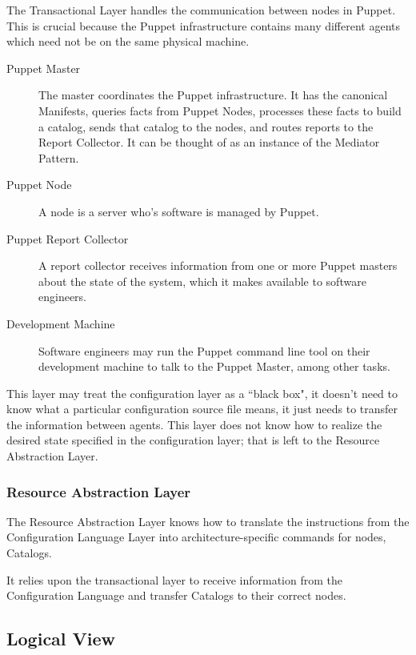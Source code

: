 \documentclass[a4paper]{article}
\begin{document}
The Transactional Layer handles the communication between nodes in Puppet. This is crucial because the Puppet infrastructure contains many different agents which need not be on the same physical machine.

\begin{description}
\item[Puppet Master] The master coordinates the Puppet infrastructure. It has the canonical Manifests, queries facts from Puppet Nodes, processes these facts to build a catalog, sends that catalog to the nodes, and routes reports to the Report Collector. It can be thought of as an instance of the Mediator Pattern.
\item[Puppet Node] A node is a server who's software is managed by Puppet.
\item[Puppet Report Collector] A report collector receives information from one or more Puppet masters about the state of the system, which it makes available to software engineers.
\item[Development Machine] Software engineers may run the Puppet command line tool on their development machine to talk to the Puppet Master, among other tasks.
\end{description}

This layer may treat the configuration layer as a ``black box", it doesn't need to know what a particular configuration source file means, it just needs to transfer the information between agents. This layer does not know how to realize the desired state specified in the configuration layer; that is left to the Resource Abstraction Layer.

\subsubsection{Resource Abstraction Layer}

The Resource Abstraction Layer knows how to translate the instructions from the Configuration Language Layer into architecture-specific commands for nodes, Catalogs.

It relies upon the transactional layer to receive information from the Configuration Language and transfer Catalogs to their correct nodes.

\subsection{Logical View}
\end{document}
